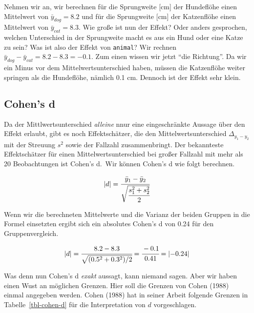 \documentclass[
  letterpaper,
]{scrbook}
\begin{document}
Nehmen wir an, wir berechnen für die Sprungweite {[}cm{]} der Hundeflöhe
einen Mittelwert von \(\bar{y}_{dog} = 8.2\) und für die Sprungweite
{[}cm{]} der Katzenflöhe einen Mittelwert von \(\bar{y}_{cat} =8.3\).
Wie große ist nun der Effekt? Oder anders gesprochen, welchen
Unterschied in der Sprungweite macht es aus ein Hund oder eine Katze zu
sein? Was ist also der Effekt von \texttt{animal}? Wir rechnen
\(\bar{y}_{dog} - \bar{y}_{cat} = 8.2 - 8.3 = -0.1\). Zum einen wissen
wir jetzt ``die Richtung''. Da wir ein Minus vor dem
Mittelwertsunterschied haben, müssen die Katzenflöhe weiter springen als
die Hundeflöhe, nämlich 0.1 cm. Dennoch ist der Effekt sehr klein.

\hypertarget{cohens-d}{%
\subsection{Cohen's d}\label{cohens-d}}

Da der Mittlwertsunterschied \emph{alleine} nnur eine eingeschränkte
Aussage über den Effekt erlaubt, gibt es noch Effektschätzer, die den
Mittelwertsunterschied \(\Delta_{y_1-y_2}\) mit der Streuung \(s^2\)
sowie der Fallzahl zusammenbringt. Der bekannteste Effektschätzer für
einen Mittelwertsunterschied bei großer Fallzahl mit mehr als 20
Beobachtungen ist Cohen's d.~Wir können Cohen's d wie folgt berechnen.

\[
|d| = \cfrac{\bar{y}_1-\bar{y}_2}{\sqrt{\cfrac{s_1^2+s_2^2}{2}}}
\]

Wenn wir die berechneten Mittelwerte und die Varianz der beiden Gruppen
in die Formel einsetzten ergibt sich ein absolutes Cohen's d von 0.24
für den Gruppenvergleich.

\[
|d| = \cfrac{8.2 - 8.3}{\sqrt{(0.5^2+0.3^2) /2}} = \cfrac{-0.1}{0.41} = \lvert-0.24\rvert
\]


Was denn nun Cohen's d \emph{exakt} aussagt, kann niemand sagen. Aber
wir haben einen Wust an möglichen Grenzen. Hier soll die Grenzen von
Cohen (1988) einmal angegeben werden. Cohen (1988) hat in seiner Arbeit
folgende Grenzen in Tabelle~\ref{tbl-cohen-d} für die Interpretation von
\(d\) vorgeschlagen.
\end{document}
